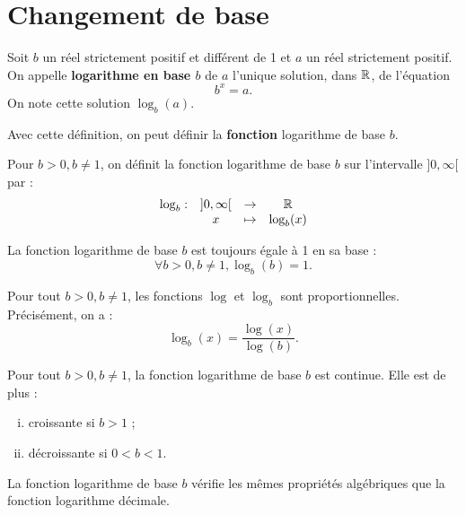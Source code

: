 \documentclass[frenchb]{report}
\begin{document}
\section{Changement de base}

\begin{defn}
Soit $b$ un réel strictement positif et différent de 1 et $a$ un réel strictement positif. On appelle \textbf{logarithme en base $b$} de $a$ l'unique solution, dans $\mathbb{R}$, de l'équation 
\[ b^x = a . \]
On note cette solution $\log_b(a)$.
\end{defn}

\begin{rmq}
Avec cette définition, on peut définir la \textbf{fonction} logarithme de base $b$.
\end{rmq}

\begin{defn}
Pour $b>0, b \neq 1$, on définit la fonction logarithme de base $b$ sur l'intervalle $]0, \infty[$ par :
\[ \begin{array}{c c c c} \log_b : & ]0, \infty[ & \to & \mathbb{R} \\ & x & \mapsto & \log_b(x) \end{array} \]
\end{defn}

\begin{rmq}
La fonction logarithme de base $b$ est toujours égale à 1 en sa base :
\[ \forall b>0, b \neq 1, \log_b(b) = 1. \]
\end{rmq}

\begin{prop}
Pour tout $b>0, b \neq 1$, les fonctions $\log$ et $\log_b$ sont proportionnelles. Précisément, on a :
\[ \log_b(x) = \dfrac{\log(x)}{\log(b)}. \]
\end{prop}

\begin{coro}
Pour tout $b>0, b \neq 1$, la fonction logarithme de base $b$ est continue. Elle est de plus :
\begin{enumerate}[(i)]
\item croissante si $b > 1$ ;
\item décroissante si $0<b<1$.
\end{enumerate}
\end{coro}

\begin{coro}
La fonction logarithme de base $b$ vérifie les mêmes propriétés algébriques que la fonction logarithme décimale.
\end{coro}
\end{document}
